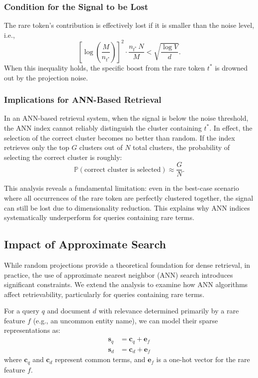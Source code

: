 \documentclass[sigconf,review]{acmart}
\begin{document}
\subsubsection{Condition for the Signal to be Lost}
The rare token's contribution is effectively lost if it is smaller than the noise level, i.e.,
\begin{equation}
\left[\log\!\left(\frac{M}{n_{t^*}}\right)\right]^2 \cdot \frac{n_{t^*}\, N}{M} < \sqrt{\frac{\log V}{d}}.
\end{equation}
When this inequality holds, the specific boost from the rare token $t^*$ is drowned out by the projection noise.

\subsubsection{Implications for ANN-Based Retrieval}
In an ANN-based retrieval system, when the signal is below the noise threshold, the ANN index cannot reliably distinguish the cluster containing $t^*$. In effect, the selection of the correct cluster becomes no better than random. If the index retrieves only the top $G$ clusters out of $N$ total clusters, the probability of selecting the correct cluster is roughly:
\begin{equation}
\mathbb{P}(\text{correct cluster is selected}) \approx \frac{G}{N}.
\end{equation}

This analysis reveals a fundamental limitation: even in the best-case scenario where all occurrences of the rare token are perfectly clustered together, the signal can still be lost due to dimensionality reduction. This explains why ANN indices systematically underperform for queries containing rare terms.

\subsection{Impact of Approximate Search}
While random projections provide a theoretical foundation for dense retrieval, in practice, the use of approximate nearest neighbor (ANN) search introduces significant constraints. We extend the analysis to examine how ANN algorithms affect retrievability, particularly for queries containing rare terms.

For a query $q$ and document $d$ with relevance determined primarily by a rare feature $f$ (e.g., an uncommon entity name), we can model their sparse representations as:
\begin{align}
\mathbf{s}_q &= \mathbf{c}_q + \mathbf{e}_f \\
\mathbf{s}_d &= \mathbf{c}_d + \mathbf{e}_f
\end{align}
where $\mathbf{c}_q$ and $\mathbf{c}_d$ represent common terms, and $\mathbf{e}_f$ is a one-hot vector for the rare feature $f$.
\end{document}
